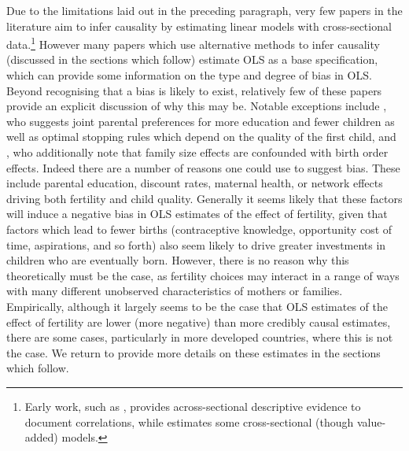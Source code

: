 Due to the limitations laid out in the preceding paragraph, very few papers in 
the literature aim to infer causality by estimating linear models with 
cross-sectional data.\footnote{Early work, such as \citet{Desai1995}, provides 
across-sectional descriptive 
evidence to document correlations, while \citet{Hanushek1992} estimates some
cross-sectional (though value-added) models.}  However many papers which use 
alternative methods to infer causality (discussed in the sections which follow)
estimate OLS as a base specification, which can provide some information on the 
type and degree of bias in OLS.  Beyond recognising that a bias is likely to 
exist, relatively few of these papers provide an explicit discussion of why this
may be.  Notable exceptions include \citet{Qian2009}, who suggests joint
parental preferences for more education and fewer children as well as optimal
stopping rules which depend on the quality of the first child, and 
\citet{Blacketal2010}, who additionally note that family size effects are 
confounded with birth order effects.  Indeed there are a number of reasons one
could use to suggest bias.  These include parental education, discount rates,
maternal health, or network effects driving both fertility and child quality.  
Generally it seems likely that these factors will induce a negative bias in OLS
estimates of the effect of fertility, given that factors which lead to fewer 
births (contraceptive knowledge, opportunity cost of time, aspirations, and so 
forth) also seem likely to drive greater investments in children who are 
eventually born.  However, there is no reason why this theoretically must be the
case, as fertility choices may interact in a range of ways with many different 
unobserved characteristics of mothers or families.  Empirically, although it 
largely seems to be the case that OLS estimates of the effect of fertility are 
lower (more negative) than more credibly causal estimates, there are some cases, 
particularly in more developed countries, where this is not the case. We return 
to provide more details on these estimates in the sections which follow.

